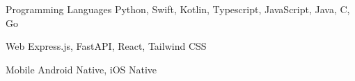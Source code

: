 \documentclass[11pt, a4paper]{awesome-cv}
\begin{document}
\begin{cvskills}
  \cvskill
    {Programming Languages} 
    {Python, Swift, Kotlin, Typescript, JavaScript, Java, C, Go} 

  \cvskill
    {Web}
    {Express.js, FastAPI, React, Tailwind CSS}

  \cvskill
    {Mobile}
    {Android Native, iOS Native}

\end{cvskills}


%
%
\end{document}
